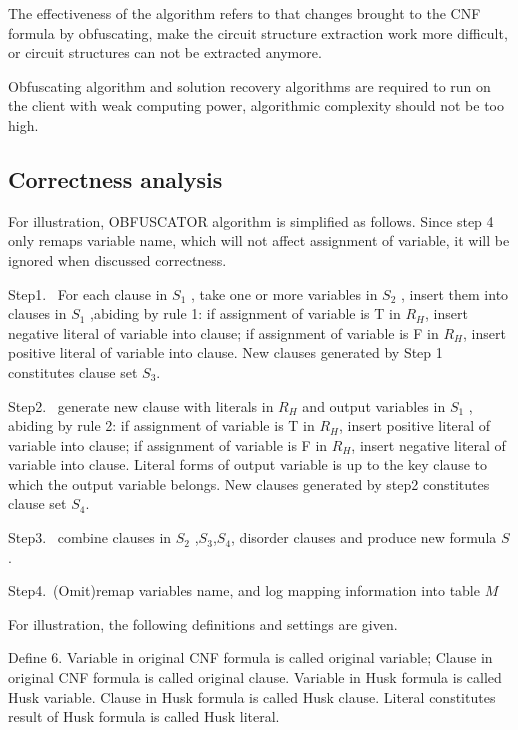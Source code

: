 \documentclass[runningheads,a4paper]{llncs}
\begin{document}
The effectiveness of the algorithm refers to that changes brought to the CNF formula by obfuscating, make the circuit structure extraction work more difficult, 
or circuit structures can not be extracted anymore. 

Obfuscating algorithm and solution recovery algorithms are required to run on the client with weak computing power, algorithmic complexity should not be too high.
\subsection{Correctness analysis}

For illustration, OBFUSCATOR algorithm is simplified as follows. Since step 4 only remaps variable name, which will not affect assignment of variable, 
it will be ignored when discussed correctness.

\noindent Step1.~ For each clause in $S_1$  , take one or more variables in $S_2$ , insert them into clauses in $S_1$ ,abiding by rule 1:
if assignment of variable is T in $R_H$, insert negative literal of variable into clause;
if assignment of variable is F in $R_H$, insert positive literal of variable into clause. 
New clauses generated by Step 1 constitutes clause set $S_3$.

\noindent Step2.~ generate new clause with literals in $R_H$ and output variables in $S_1$ , abiding by rule 2: 
if assignment of variable is T in $R_H$, insert positive literal of variable into clause;
if assignment of variable is F in $R_H$, insert negative literal of variable into clause.
Literal forms of output variable is up to the key clause to which the output variable belongs. 
New clauses generated by step2 constitutes clause set $S_4$.

\noindent Step3.~ combine clauses in $S_2$ ,$S_3$,$S_4$, disorder clauses and produce new formula $S$.

\noindent Step4.~(Omit)remap variables name, and log mapping information into table $M$ 

For illustration, the following definitions and settings are given.

\noindent Define 6. Variable in original CNF formula is called original variable; Clause in original CNF formula is called original clause. 
Variable in Husk formula is called Husk variable. Clause in Husk formula is called Husk clause. Literal constitutes result of Husk formula is called Husk literal.
\end{document}
